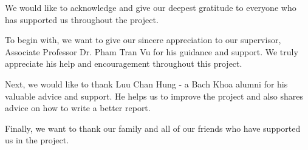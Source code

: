 We would like to acknowledge and give our deepest gratitude to everyone who has supported us throughout the project.

\hfill

To begin with, we want to give our sincere appreciation to our supervisor, Associate Professor Dr. Pham Tran Vu for his guidance and support. We truly appreciate his help and encouragement throughout this project. 

\hfill

Next, we would like to thank Luu Chan Hung - a Bach Khoa alumni for his valuable advice and support. He helps us to improve the project and also shares advice on how to write a better report. 

\hfill

Finally, we want to thank our family and all of our friends who have supported us in the project.